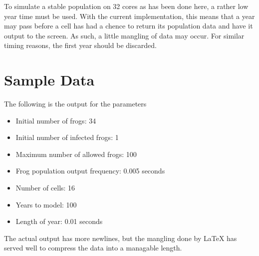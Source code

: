 \documentclass[12pt,a4paper]{article}
\begin{document}
To simulate a stable population on 32 cores as has been done here,
a rather low year time must be used.
With the current implementation, this means that a year may pass
before a cell has had a chence to return its population data and have
it output to the screen.
As such, a little mangling of data may occur.
For similar timing reasons, the first year should be discarded.


\newpage
\appendix
\section{Sample Data}
The following is the output for the parameters
\begin{itemize}
    \item Initial number of frogs: 34
    \item Initial number of infected frogs: 1
    \item Maximum number of allowed frogs: 100
    \item Frog population output frequency: 0.005 seconds
    \item Number of cells: 16
    \item Years to model: 100
    \item Length of year: 0.01 seconds
\end{itemize}

The actual output has more newlines, but the mangling done by LaTeX
has served well to compress the data into a managable length.
\end{document}
